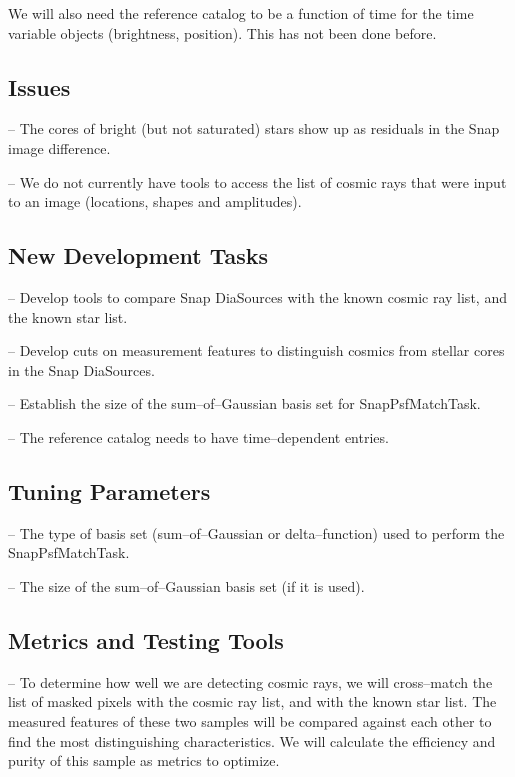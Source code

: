 \documentclass[12pt]{article}
\begin{document}
We will also need the reference catalog to be a function of time for
the time variable objects (brightness, position).  This has not been
done before.

\subsection{Issues}

-- The cores of bright (but not saturated) stars show up as residuals
in the Snap image difference.

-- We do not currently have tools to access the list of cosmic rays
that were input to an image (locations, shapes and amplitudes).

\subsection{New Development Tasks}


-- Develop tools to compare Snap DiaSources with the known cosmic ray
list, and the known star list.

-- Develop cuts on measurement features to distinguish cosmics from
stellar cores in the Snap DiaSources.

-- Establish the size of the sum--of--Gaussian basis set for SnapPsfMatchTask.

-- The reference catalog needs to have time--dependent entries.

\subsection{Tuning Parameters}

-- The type of basis set (sum--of--Gaussian or delta--function) used
to perform the SnapPsfMatchTask.

-- The size of the sum--of--Gaussian basis set (if it is used).

\subsection{Metrics and Testing Tools}

-- To determine how well we are detecting cosmic rays, we will
cross--match the list of masked pixels with the cosmic ray list, and
with the known star list.  The measured features of these two samples
will be compared against each other to find the most distinguishing
characteristics.  We will calculate the efficiency and purity of this
sample as metrics to optimize.
\end{document}
